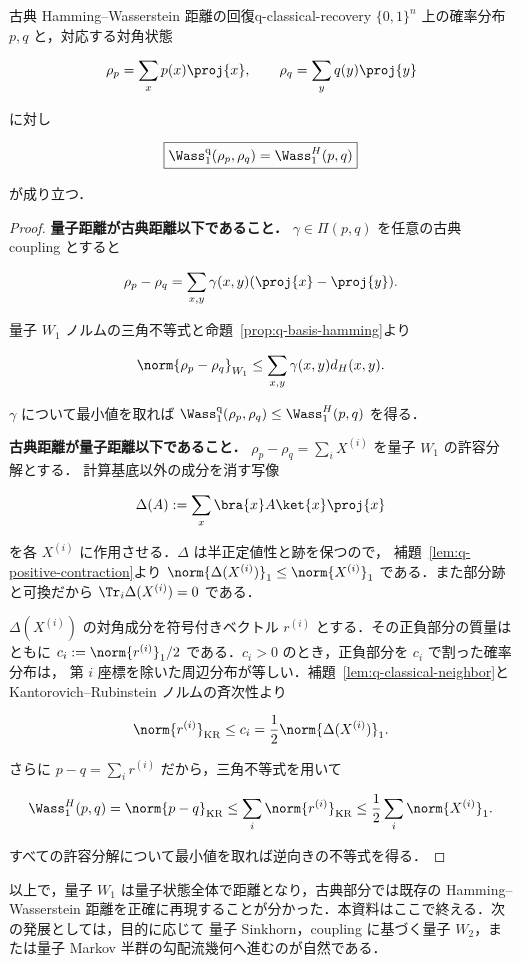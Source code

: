 \begin{theorem}{古典 Hamming--Wasserstein 距離の回復}{q-classical-recovery}
  $\{0,1\}^n$ 上の確率分布 $p,q$ と，対応する対角状態

  \[
    \rho_p=\sum_xp(x)\proj{x},
    \qquad
    \rho_q=\sum_yq(y)\proj{y}
  \]

  に対し

  \[
    \boxed{
      \Wass_1^{\rm q}(\rho_p,\rho_q)=\Wass_1^H(p,q)
    }
  \]

  が成り立つ．
\end{theorem}

\begin{proof}
  \textbf{量子距離が古典距離以下であること．}
  $\gamma\in\Pi(p,q)$ を任意の古典 coupling とすると

  \[
    \rho_p-\rho_q
    =\sum_{x,y}\gamma(x,y)(\proj{x}-\proj{y}).
  \]

  量子 $W_1$ ノルムの三角不等式と命題~\ref{prop:q-basis-hamming}より

  \[
    \norm{\rho_p-\rho_q}_{W_1}
    \leq\sum_{x,y}\gamma(x,y)d_H(x,y).
  \]

  $\gamma$ について最小値を取れば
  $\Wass_1^{\rm q}(\rho_p,\rho_q)\leq\Wass_1^H(p,q)$ を得る．

  \textbf{古典距離が量子距離以下であること．}
  $\rho_p-\rho_q=\sum_iX^{(i)}$ を量子 $W_1$ の許容分解とする．
  計算基底以外の成分を消す写像

  \[
    \Delta(A):=\sum_x\bra{x}A\ket{x}\proj{x}
  \]

  を各 $X^{(i)}$ に作用させる．$\Delta$ は半正定値性と跡を保つので，
  補題~\ref{lem:q-positive-contraction}より
  $\norm{\Delta(X^{(i)})}_1\leq\norm{X^{(i)}}_1$ である．また部分跡と可換だから
  $\Tr_i\Delta(X^{(i)})=0$ である．

  $\Delta(X^{(i)})$ の対角成分を符号付きベクトル $r^{(i)}$ とする．その正負部分の質量はともに
  $c_i:=\norm{r^{(i)}}_1/2$ である．$c_i>0$ のとき，正負部分を $c_i$ で割った確率分布は，
  第 $i$ 座標を除いた周辺分布が等しい．補題~\ref{lem:q-classical-neighbor}と
  Kantorovich--Rubinstein ノルムの斉次性より

  \[
    \norm{r^{(i)}}_{\rm KR}\leq c_i
    =\frac12\norm{\Delta(X^{(i)})}_1.
  \]

  さらに $p-q=\sum_ir^{(i)}$ だから，三角不等式を用いて

  \[
    \Wass_1^H(p,q)
    =\norm{p-q}_{\rm KR}
    \leq\sum_i\norm{r^{(i)}}_{\rm KR}
    \leq\frac12\sum_i\norm{X^{(i)}}_1.
  \]

  すべての許容分解について最小値を取れば逆向きの不等式を得る．
\end{proof}

以上で，量子 $W_1$ は量子状態全体で距離となり，古典部分では既存の Hamming--Wasserstein
距離を正確に再現することが分かった．本資料はここで終える．次の発展としては，目的に応じて
量子 Sinkhorn，coupling に基づく量子 $W_2$，または量子 Markov 半群の勾配流幾何へ進むのが自然である．

